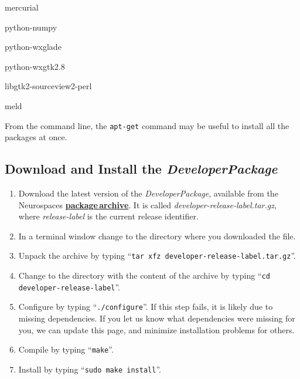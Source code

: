 \documentclass[12pt]{article}
\begin{document}
\begin{description}

\item mercurial
\item python-numpy
\item python-wxglade
\item python-wxgtk2.8


\item libgtk2-sourceview2-perl
\item meld

% 
% 
%
% 
% 

\end{description}

From the command line, the {\tt apt-get} command may be useful to
install all the packages at once.


\subsection*{Download and Install the {\emph{DeveloperPackage}}}

\begin{enumerate}
   \item Download the latest version of the {\it DeveloperPackage}, available from the Neurospaces \href{http://repo-genesis3.cbi.utsa.edu/src/}{\bf package\,archive}. It is called {\it developer-release-label.tar.gz}, where {\it release-label} is the current release identifier.
   \item In a terminal window change to the directory where you downloaded the file.
   \item Unpack the archive by typing ``{\tt tar xfz developer-release-label.tar.gz}''.
   \item Change to the directory with the content of the archive by typing ``{\tt cd developer-release-label}''.
   \item Configure by typing ``{\tt ./configure}''.  If this step fails, it is likely due to missing dependencies.  If you let us know what dependencies were missing for you, we can update this page, and minimize installation problems for others.
   \item Compile by typing ``{\tt make}''.
   \item Install by typing ``{\tt sudo make install}''. 
\end{enumerate}
\end{document}
